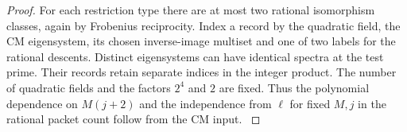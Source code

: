 \begin{proof}
For each restriction type there
are at most two rational isomorphism classes, again by
Frobenius reciprocity. Index a record by the quadratic field,
the CM eigensystem, its chosen inverse-image multiset and one
of two labels for the rational descents. Distinct eigensystems
can have identical spectra at the test prime. Their records
retain separate indices in the integer product. The number of
quadratic fields and the factors \(2^4\) and \(2\) are
fixed. Thus the polynomial dependence on \(M(j+2)\) and
the independence from \(\ell\) for fixed \(M,j\) in the
rational packet count follow from the CM input. \label{cor:ordinary-symplectic-cohomology-21}
\end{proof}
